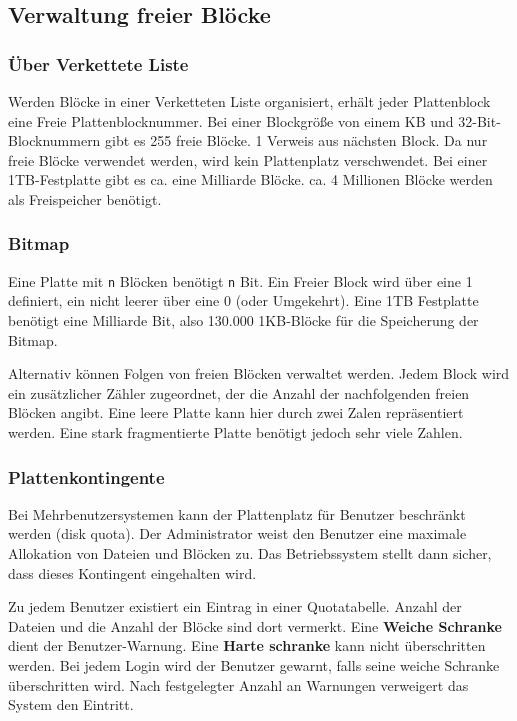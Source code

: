 \subsection{Verwaltung freier Blöcke}

\subsubsection{Über Verkettete Liste}

Werden Blöcke in einer Verketteten Liste organisiert, erhält jeder Plattenblock
eine Freie Plattenblocknummer. Bei einer Blockgröße von einem KB und
32-Bit-Blocknummern gibt es 255 freie Blöcke. 1 Verweis aus nächsten Block. Da
nur freie Blöcke verwendet werden, wird kein Plattenplatz verschwendet. Bei
einer 1TB-Festplatte gibt es ca. eine Milliarde Blöcke. ca. 4 Millionen Blöcke
werden als Freispeicher benötigt.

\subsubsection{Bitmap}

Eine Platte mit \texttt{n} Blöcken benötigt \texttt{n} Bit. Ein Freier Block
wird über eine 1 definiert, ein nicht leerer über eine 0 (oder Umgekehrt). Eine
1TB Festplatte benötigt eine Milliarde Bit, also 130.000 1KB-Blöcke für die
Speicherung der Bitmap.

Alternativ können Folgen von freien Blöcken verwaltet werden. Jedem Block wird
ein zusätzlicher Zähler zugeordnet, der die Anzahl der nachfolgenden freien
Blöcken angibt. Eine leere Platte kann hier durch zwei Zalen repräsentiert
werden. Eine stark fragmentierte Platte benötigt jedoch sehr viele Zahlen.

\subsubsection{Plattenkontingente}

Bei Mehrbenutzersystemen kann der Plattenplatz für Benutzer beschränkt werden
(disk quota). Der Administrator weist den Benutzer eine maximale Allokation von
Dateien und Blöcken zu. Das Betriebssystem stellt dann sicher, dass dieses
Kontingent eingehalten wird.

Zu jedem Benutzer existiert ein Eintrag in einer Quotatabelle. Anzahl der
Dateien und die Anzahl der Blöcke sind dort vermerkt. Eine \textbf{Weiche
    Schranke} dient der Benutzer-Warnung. Eine \textbf{Harte schranke} kann nicht
überschritten werden. Bei jedem Login wird der Benutzer gewarnt, falls seine
weiche Schranke überschritten wird. Nach festgelegter Anzahl an Warnungen
verweigert das System den Eintritt.

